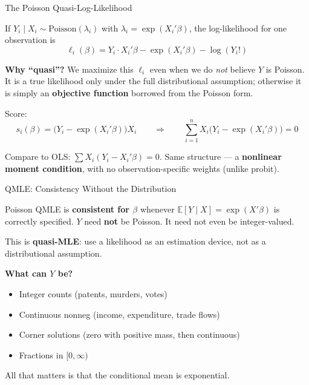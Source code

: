 \documentclass[aspectratio=169, handout, t]{beamer}
\numberwithin{equation}{section}
\begin{document}

\begin{frame}{The Poisson Quasi-Log-Likelihood}

If $Y_i\mid X_i \sim \text{Poisson}(\lambda_i)$ with $\lambda_i = \exp(X_i'\beta)$, the log-likelihood for one observation is
\[
\ell_i(\beta) = Y_i \cdot X_i'\beta - \exp(X_i'\beta) - \log(Y_i!)
\]

\pause

\textbf{Why ``quasi''?} We maximize this $\ell_i$ even when we do \emph{not} believe $Y$ is Poisson. It is a true likelihood only under the full distributional assumption; otherwise it is simply an \textbf{objective function} borrowed from the Poisson form.

\pause

Score:
\[
s_i(\beta) = \bigl(Y_i - \exp(X_i'\beta)\bigr) X_i
\qquad\Longrightarrow\qquad
\boxed{\sum_{i=1}^n X_i\bigl(Y_i - \exp(X_i'\beta)\bigr) = 0}
\]

\pause

Compare to OLS: $\sum X_i(Y_i - X_i'\beta) = 0$. Same structure --- a \textbf{nonlinear moment condition}, with no observation-specific weights (unlike probit).

\end{frame}


\begin{frame}{QMLE: Consistency Without the Distribution}

\begin{tcolorbox}[colback=blue!5, colframe=blue!50, title=Key Result (Gourieroux et al.~1984; Wooldridge 2010{,} 2023), boxsep=2pt, top=2pt, bottom=2pt]
Poisson QMLE is \textbf{consistent for $\beta$} whenever $\mathbb{E}[Y \mid X] = \exp(X'\beta)$ is correctly specified.
$Y$ need \textbf{not} be Poisson. It need not even be integer-valued.
\end{tcolorbox}

\pause

\smallskip

This is \textbf{quasi-MLE}: use a likelihood as an estimation device, not as a distributional assumption.

\pause

\smallskip

\textbf{What can $Y$ be?}
\begin{itemize}\setlength{\itemsep}{1pt}
    \item Integer counts (patents, murders, votes)
    \item Continuous nonneg (income, expenditure, trade flows)
    \item Corner solutions (zero with positive mass, then continuous)
    \item Fractions in $[0,\infty)$
\end{itemize}

\pause

All that matters is that the conditional mean is exponential.

\end{frame}
\end{document}
